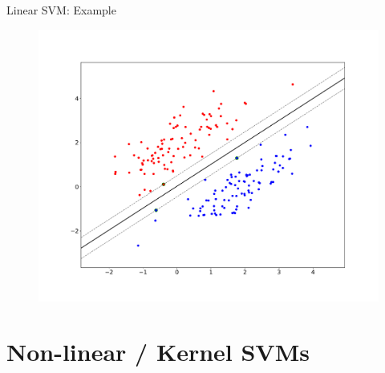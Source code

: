 \begin{frame}{Linear SVM: Example}{}
	\vspace*{-2mm}
	\begin{figure}
		\centering
		\includegraphics[scale=0.2]{11_svm/02_img/svm_linear}
	\end{figure}
\end{frame}


\section{Non-linear / Kernel SVMs}


